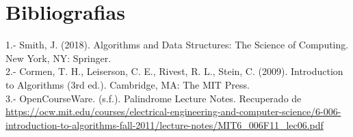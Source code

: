 \chapter{Bibliografias}
1.- Smith, J. (2018). Algorithms and Data Structures: The Science of Computing. New York, NY: Springer.\newline
\\

2.- Cormen, T. H., Leiserson, C. E., Rivest, R. L., Stein, C. (2009). Introduction to Algorithms (3rd ed.). Cambridge, MA: The MIT Press.\newline
\\

3.- OpenCourseWare. (s.f.). Palindrome Lecture Notes. Recuperado de \url{https://ocw.mit.edu/courses/electrical-engineering-and-computer-science/6-006-introduction-to-algorithms-fall-2011/lecture-notes/MIT6_006F11_lec06.pdf} \newline



